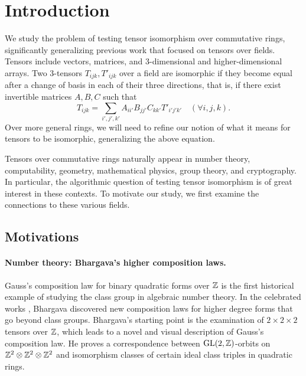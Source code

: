 \section{Introduction}


We study the problem of testing tensor isomorphism over commutative rings, significantly generalizing previous work that focused on tensors over fields. Tensors include vectors, matrices, and 3-dimensional and higher-dimensional arrays. Two 3-tensors $T_{ijk}, T'_{ijk}$ over a field are isomorphic if they become equal after a change of basis in each of their three directions, that is, if there exist invertible matrices $A,B,C$ such that
\[
T_{ijk} = \sum_{i',j',k'} A_{ii'} B_{jj'} C_{kk'} T'_{i'j'k'} \quad (\forall i,j,k).
\]
Over more general rings, we will need to refine our notion of what it means for tensors to be isomorphic, generalizing the above equation. 

Tensors over commutative rings naturally appear in number theory, computability, geometry, mathematical physics, group theory, and cryptography. In particular, the algorithmic question of testing tensor isomorphism is of great interest in these contexts. To motivate our study, we first examine the connections to these various fields.

\subsection{Motivations}\label{subsec:motivation}

\paragraph{Number theory: Bhargava's higher composition laws.} Gauss's composition law for binary quadratic forms over $\mathbb{Z}$ is the first historical example of studying the class group in algebraic number theory. In the celebrated works \cite{Bhargava,higher-2,higher-3,higher-4}, Bhargava discovered new composition laws for higher degree forms that go beyond class groups.
Bhargava's starting point is the examination of $2\times 2\times 2$ tensors over $\mathbb{Z}$, which leads to a novel and visual description of Gauss's composition law. He proves a correspondence between $\mathrm{GL}(2, \mathbb{Z})$-orbits on $\mathbb{Z}^2\otimes\mathbb{Z}^2\otimes\mathbb{Z}^2$ and isomorphism classes of certain ideal class triples in quadratic rings. 


